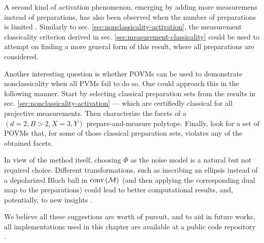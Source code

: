         A second kind of activation phenomenon, emerging by adding more measuremens instead of preparations, has also been observed when the number of preparations is limited \cite{poderini_pamcriteria_2020}. Similarly to sec. \ref{sec:nonclassicality-activation}, the measurement classicality criterion derived in sec. \ref{sec:measurement-classicality} could be used to attempt on finding a more general form of this result, where all preparations are considered.

        Another interesting question is whether POVMs can be used to demonstrate nonclassicality when all PVMs fail to do so. One could approach this in the following manner. Start by selecting classical preparation sets from the results in sec. \ref{sec:nonclassicality-activation} --- which are certifiedly classical for all projective measurements. Then characterize the facets of a $(d=2, B>2, X=3,Y)$ prepare-and-measure polytope. Finally, look for a set of POVMs that, for some of those classical preparation sets, violates any of the obtained facets.

        In view of the method itself, choosing $\Phi$ as the noise model is a natural but not required choice. Different transformations, such as inscribing an ellipsis instead of a depolarized Bloch ball in $\text{conv} \left( \mathcal{M} \right)$ (and then applying the corresponding dual map to the preparations) could lead to better computational results, and, potentially, to new insights \cite{fillettaz_algorithmic_2018}.

        We believe all these suggestions are worth of pursuit, and to aid in future works, all implementations used in this chapter are available at a public code repository \cite{classicality_repository}.